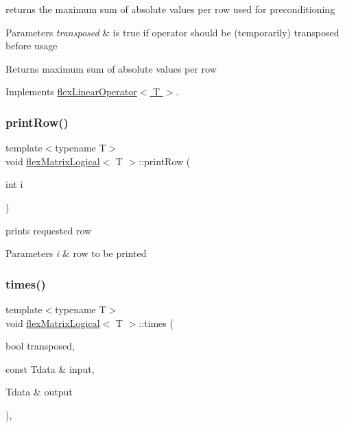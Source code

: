 returns the maximum sum of absolute values per row used for preconditioning 


\begin{DoxyParams}{Parameters}
{\em transposed} & is true if operator should be (temporarily) transposed before usage \\
\hline
\end{DoxyParams}
\begin{DoxyReturn}{Returns}
maximum sum of absolute values per row 
\end{DoxyReturn}


Implements \hyperlink{classflex_linear_operator_afcb74697385ccb7c8d29870d7034c12a}{flex\+Linear\+Operator$<$ T $>$}.

\mbox{\label{classflex_matrix_logical_a27805a561e6e94bdffe965dc8b9a3915}} 
\subsubsection{\texorpdfstring{print\+Row()}{printRow()}}
{\footnotesize\ttfamily template$<$typename T$>$ \\
void \hyperlink{classflex_matrix_logical}{flex\+Matrix\+Logical}$<$ T $>$\+::print\+Row (\begin{DoxyParamCaption}\item[{int}]{i }\end{DoxyParamCaption})\hspace{0.3cm}{\ttfamily [inline]}}



prints requested row 


\begin{DoxyParams}{Parameters}
{\em i} & row to be printed \\
\hline
\end{DoxyParams}
\mbox{\label{classflex_matrix_logical_ab1ccf3400da547a27b5753a894905c63}} 
\subsubsection{\texorpdfstring{times()}{times()}}
{\footnotesize\ttfamily template$<$typename T$>$ \\
void \hyperlink{classflex_matrix_logical}{flex\+Matrix\+Logical}$<$ T $>$\+::times (\begin{DoxyParamCaption}\item[{bool}]{transposed,  }\item[{const Tdata \&}]{input,  }\item[{Tdata \&}]{output }\end{DoxyParamCaption})\hspace{0.3cm}{\ttfamily [inline]}, {\ttfamily [virtual]}}



